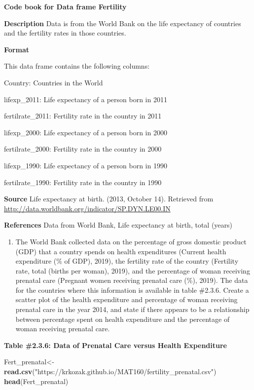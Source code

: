 \documentclass[]{book}
\newenvironment{Shaded}{\begin{snugshade}}{\end{snugshade}}
\newcommand{\KeywordTok}[1]{\textcolor[rgb]{0.13,0.29,0.53}{\textbf{#1}}}
\newcommand{\NormalTok}[1]{#1}
\newcommand{\StringTok}[1]{\textcolor[rgb]{0.31,0.60,0.02}{#1}}
\providecommand{\tightlist}{%
  \setlength{\itemsep}{0pt}\setlength{\parskip}{0pt}}
\begin{document}
\textbf{Code book for Data frame Fertility}

\textbf{Description}
Data is from the World Bank on the life expectancy of countries and the fertility rates in those countries.

\textbf{Format}

This data frame contains the following columns:

Country: Countries in the World

lifexp\_2011: Life expectancy of a person born in 2011

fertilrate\_2011: Fertility rate in the country in 2011

lifexp\_2000: Life expectancy of a person born in 2000

fertilrate\_2000: Fertility rate in the country in 2000

lifexp\_1990: Life expectancy of a person born in 1990

fertilrate\_1990: Fertility rate in the country in 1990

\textbf{Source}
Life expectancy at birth. (2013, October 14). Retrieved from
\url{http://data.worldbank.org/indicator/SP.DYN.LE00.IN}

\textbf{References}
Data from World Bank, Life expectancy at birth, total (years)

\begin{enumerate}
\def\labelenumi{\arabic{enumi}.}
\setcounter{enumi}{3}
\tightlist
\item
  The World Bank collected data on the percentage of gross domestic product (GDP) that a country spends on health expenditures (Current health expenditure (\% of GDP), 2019), the fertility rate of the country (Fertility rate, total (births per woman), 2019), and the percentage of woman receiving prenatal care (Pregnant women receiving prenatal care (\%), 2019). The data for the countries where this information is available in table \#2.3.6. Create a scatter plot of the health expenditure and percentage of woman receiving prenatal care in the year 2014, and state if there appears to be a relationship between percentage spent on health expenditure and the percentage of woman receiving prenatal care.
\end{enumerate}

\textbf{Table \#2.3.6: Data of Prenatal Care versus Health Expenditure}

\begin{Shaded}
\begin{Highlighting}[]
\NormalTok{Fert_prenatal<-}\StringTok{ }\KeywordTok{read.csv}\NormalTok{(}\StringTok{"https://krkozak.github.io/MAT160/fertility_prenatal.csv"}\NormalTok{)}
\KeywordTok{head}\NormalTok{(Fert_prenatal)}
\end{Highlighting}
\end{Shaded}
\end{document}
